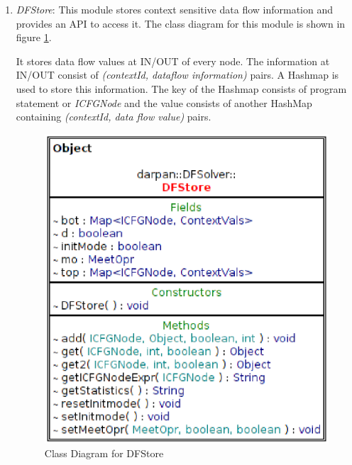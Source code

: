 \documentclass[11pt,a4paper,openright]{report}
\begin{document}
\begin{enumerate}
\item \emph{DFStore}: This module stores context sensitive data flow information and provides an API to access it. The class diagram for this module 
is shown in figure \ref{fig:dfstore}.

It stores data flow values at IN/OUT of every node. The information at IN/OUT consist of \emph{(contextId, dataflow information)} pairs. 
A Hashmap is used to store this information. The key of the Hashmap consists of program statement or \emph{ICFGNode} and the value consists
of another HashMap containing \emph{(contextId, data flow value)} pairs.

% 



\begin{figure}
\includegraphics[scale=0.8]{class_diagrams/updatedClassDiagrams/DFStore_C.eps}
\caption{Class Diagram for DFStore}
\label{fig:dfstore}
\end{figure}



\end{enumerate}
\end{document}
